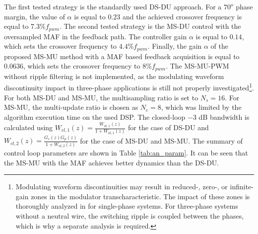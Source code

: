 \documentclass[conference]{IEEEtran}
\begin{document}
The first tested strategy is the standardly used DS-DU approach. For a $70^o$ phase margin, the value of $\alpha$ is equal to $0.23$ and the achieved crossover frequency is equal to $7.3 \% f_{pwm}$.
The second tested strategy is the MS-DU control with the oversampled MAF in the feedback path. The controller gain $\alpha$ is equal to $0.14$, which sets the crossover frequency to $4.4 \% f_{pwm}$.
Finally, the gain $\alpha$ of the proposed MS-MU method with a MAF based feedback acquisition is equal to $0.0636$, which sets the crossover frequency to $8 \%  f_{pwm}$. The MS-MU-PWM without ripple filtering is not implemented, as the modulating waveform discontinuity impact in three-phase applications is still not properly investigated\footnote{Modulating waveform discontinuities may result in reduced-, zero-, or infinite-gain zones in the modulator transcharacteristic. The impact of these zones is thoroughly analyzed in \cite{Petric2021b} for single-phase systems. For three-phase systems without a neutral wire, the switching ripple is coupled between the phases, which is why a separate analysis is required.}. 
For both MS-DU and MS-MU, the multisampling ratio is set to $N_s = 16$. For MS-MU, the multi-update ratio is chosen as $N_c = 8$, which was limited by the algorithm execution time on the used DSP.
The closed-loop $-3$ dB bandwidth is calculated using $W_{cl,1}(z) = \frac{W_{ol,1}(z)}{1+W_{ol,1}(z)}$ for the case of DS-DU and $W_{cl,2}(z) = \frac{G_c(z) G_p(z)}{1+W_{ol,2}(z)}$ for the case of MS-DU and MS-MU. The summary of control loop parameters are shown in Table \ref{tab:an_param}. It can be seen that the MS-MU with the MAF achieves better dynamics than the DS-DU.
\end{document}
